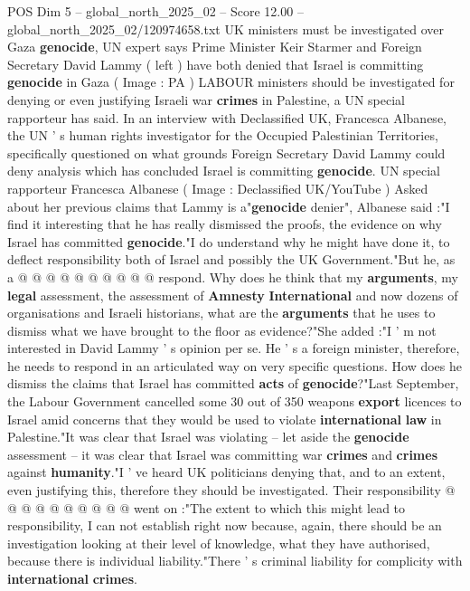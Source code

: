 \begin{textsample}{POS Dim 5 – global\_north\_2025\_02 – Score 12.00 – global\_north\_2025\_02/120974658.txt}  \label{ex:f5_pos_339}
UK ministers must be investigated over Gaza \textbf{genocide}, UN expert says Prime Minister Keir Starmer and Foreign Secretary David Lammy ( left ) have both denied that Israel is committing \textbf{genocide} in Gaza ( Image : PA ) LABOUR ministers should be investigated for denying or even justifying Israeli war \textbf{crimes} in Palestine, a UN special rapporteur has said.
In an interview with Declassified UK, Francesca Albanese, the UN ' s human rights investigator for the Occupied Palestinian Territories, specifically questioned on what grounds Foreign Secretary David Lammy could deny analysis which has concluded Israel is committing \textbf{genocide}.
UN special rapporteur Francesca Albanese ( Image : Declassified UK/YouTube ) Asked about her previous claims that Lammy is a"\textbf{genocide} denier", Albanese said :"I find it interesting that he has really dismissed the proofs, the evidence on why Israel has committed \textbf{genocide}."I do understand why he might have done it, to deflect responsibility both of Israel and possibly the UK Government."But he, as a @ @ @ @ @ @ @ @ @ @ respond.
Why does he think that my \textbf{arguments}, my \textbf{legal} assessment, the assessment of \textbf{Amnesty} \textbf{International} and now dozens of organisations and Israeli historians, what are the \textbf{arguments} that he uses to dismiss what we have brought to the floor as evidence?"She added :"I ' m not interested in David Lammy ' s opinion per se.
He ' s a foreign minister, therefore, he needs to respond in an articulated way on very specific questions.
How does he dismiss the claims that Israel has committed \textbf{acts} of \textbf{genocide}?"Last September, the Labour Government cancelled some 30 out of 350 weapons \textbf{export} licences to Israel amid concerns that they would be used to violate \textbf{international} \textbf{law} in Palestine."It was clear that Israel was violating -- let aside the \textbf{genocide} assessment -- it was clear that Israel was committing war \textbf{crimes} and \textbf{crimes} against \textbf{humanity}."I ' ve heard UK politicians denying that, and to an extent, even justifying this, therefore they should be investigated.
Their responsibility @ @ @ @ @ @ @ @ @ @ went on :"The extent to which this might lead to responsibility, I can not establish right now because, again, there should be an investigation looking at their level of knowledge, what they have authorised, because there is individual liability."There ' s criminal liability for complicity with \textbf{international} \textbf{crimes}.

\end{textsample}
